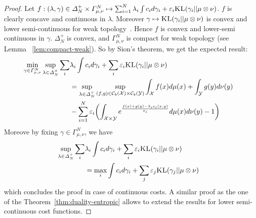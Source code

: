 \begin{proof}
Let $f: (\lambda,\gamma)\in\Delta^+_N\times\Gamma^N_{\mu,\nu}\mapsto\sum_{i=1}^N \lambda_i\int c_i d\gamma_i + \varepsilon_i \textsc{KL}(\gamma_i||\mu\otimes\nu)$. $f$ is clearly concave and continuous in $\lambda$. Moreover $\gamma\mapsto \textsc{KL}(\gamma_i||\mu\otimes\nu)$ is convex and lower semi-continuous for weak topology~\citep[Lemma 1.4.3]{dupuis2011weak}. Hence $f$ is convex and lower-semi continuous in $\gamma$. $\Delta^+_N$ is  convex, and  $\Gamma^N_{\mu,\nu}$ is compact for weak topology (see  Lemma
~\ref{lem:compact-weak}). So by Sion's theorem,  we get the expected  result:
\begin{align*}
\min_{\gamma\in\Gamma^N_{\mu,\nu}} \sup_{\lambda\in\Delta^+_N}\sum_{i}&\lambda_i \int c_i d\gamma_i + \sum_i\varepsilon_i \KL(\gamma_i||\mu\otimes\nu)\\
&=\sup_{\lambda\in\Delta^+_N} \sup_{(f,g)\in\mathcal{C}_b(\mathcal{X})\times\mathcal{C}_b(\mathcal{Y})}\int_{\mathcal{X}} f(x)d\mu(x)+ \int_{\mathcal{Y}} g(y)d\nu(y)\\
&-\sum_{i=1}^N\varepsilon_i\left( \int_{\mathcal{X}\times\mathcal{Y}} e^{\frac{f(x)+g(y)-\lambda_ic_i(x,y)}{\varepsilon_i}} d\mu(x)d\nu(y)-1\right)
\end{align*}
Moreove by fixing $\gamma\in\Gamma^N_{\mu,\nu}$, we have
\begin{align*}
\sup_{\lambda\in\Delta^+_N}\sum_{i}&\lambda_i \int c_i d\gamma_i + \sum_i\varepsilon_i \textsc{KL}(\gamma_i||\mu\otimes\nu)\\
&=\max_{i}\int c_i d\gamma_i + \sum_j\varepsilon_j \textsc{KL}(\gamma_j||\mu\otimes\nu)\\
\end{align*}
which concludes the proof in case of continuous costs. A similar proof as the one of the Theorem~\ref{thm:duality-entropic} allows to extend the results for lower semi-continuous cost functions.
\end{proof}




\newpage 

